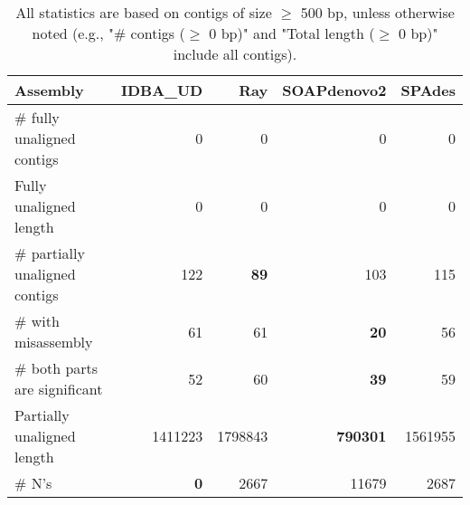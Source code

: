 \documentclass[12pt,a4paper]{article}
\begin{document}
\begin{table}[ht]
\begin{center}
\caption{All statistics are based on contigs of size $\geq$ 500 bp, unless otherwise noted (e.g., "\# contigs ($\geq$ 0 bp)" and "Total length ($\geq$ 0 bp)" include all contigs).}
\begin{tabular}{|l*{4}{|r}|}
\hline
Assembly & IDBA\_UD & Ray & SOAPdenovo2 & SPAdes \\ \hline
\# fully unaligned contigs & 0 & 0 & 0 & 0 \\ \hline
Fully unaligned length & 0 & 0 & 0 & 0 \\ \hline
\# partially unaligned contigs & 122 & {\bf 89} & 103 & 115 \\ \hline
\hspace{5mm}\# with misassembly & 61 & 61 & {\bf 20} & 56 \\ \hline
\hspace{5mm}\# both parts are significant & 52 & 60 & {\bf 39} & 59 \\ \hline
Partially unaligned length & 1411223 & 1798843 & {\bf 790301} & 1561955 \\ \hline
\# N's & {\bf 0} & 2667 & 11679 & 2687 \\ \hline
\end{tabular}
\end{center}
\end{table}
\end{document}

